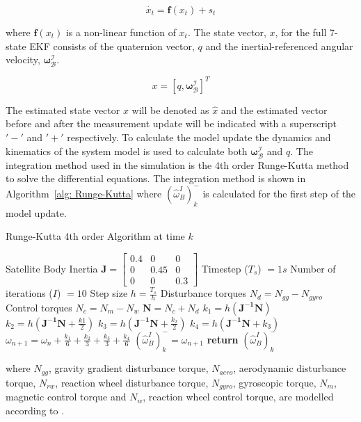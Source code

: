 \begin{equation}
	\dot{x_t} = \mathbf{f}(x_t) + s_t
\end{equation}

where $\mathbf{f}(x_t)$ is a non-linear function of $x_t$. The state vector, $x$, for the full 7-state EKF consists of the quaternion vector, $q$ and the inertial-referenced angular velocity, $\boldsymbol{\omega}_{\mathcal{B}}^{\mathcal{I}}$.

\begin{equation}
	x = [q, \boldsymbol{\omega}_{\mathcal{B}}^{\mathcal{I}}]^T
\end{equation}

The estimated state vector $x$ will be denoted as $\hat{x}$ and the estimated vector before and after the measurement update will be indicated with a superscript $'-'$ and $'+'$ respectively. To calculate the model update the dynamics and kinematics of the system model is used to calculate both $\boldsymbol{\omega}_{\mathcal{B}}^{\mathcal{I}}$ and $q$. The integration method used in the simulation is the 4th order Runge-Kutta method to solve the differential equations. The integration method is shown in Algorithm~\ref{alg: Runge-Kutta} where $(\hat{\omega}_B^I)_k^-$ is calculated for the first step of the model update.

\begin{algorithm}[!htb]
	\caption[Runge-Kutta]{Runge-Kutta 4th order Algorithm at time $k$}
	\label{alg: Runge-Kutta}
	\begin{algorithmic}[1]
		\State Satellite Body Inertia $\mathbf{J} = \begin{bmatrix}
			0.4 & 0 & 0\\
			0 & 0.45 & 0 \\
			0 & 0 & 0.3
		\end{bmatrix}$
		\State Timestep ($T_s$) $= 1s$
		\State Number of iterations ($I$) $= 10$
		\State Step size $h = \frac{T_s}{h}$
		\State Disturbance torques $N_d = N_{gg} - N_{gyro} $ %
		\State Control torques $N_c = N_m - N_w$
		\State $\mathbf{N} = N_c + N_d$
		\State \texttt{$k_1 = h(\mathbf{J^{-1}}\mathbf{N})$}
		\State \texttt{$k_2 = h(\mathbf{J^{-1}}\mathbf{N} + \frac{k1}{2})$}
		\State \texttt{$k_3 = h(\mathbf{J^{-1}}\mathbf{N} + \frac{k_2}{2})$}
		\State \texttt{$k_4 = h(\mathbf{J^{-1}}\mathbf{N} + k_3)$}
		\State \texttt{$\omega_{n+1}=\omega_n + \frac{k_1}{6} + \frac{k_2}{3} + \frac{k_3}{3} + \frac{k_4}{6}$}
		\EndFor
		\State $(\hat{\omega}_B^I)_k^- = \omega_{n+1}$
		\State \textbf{return} $(\hat{\omega}_B^I)_k^-$
	\end{algorithmic}
\end{algorithm}
where $N_{gg}$, gravity gradient disturbance torque, $N_{aero}$, aerodynamic disturbance torque, $N_{rw}$, reaction wheel disturbance torque, $N_{gyro}$, gyroscopic torque, $N_m$, magnetic control torque and $N_w$, reaction wheel control torque, are modelled according to \cite{JansevanVuuren2015}. 

